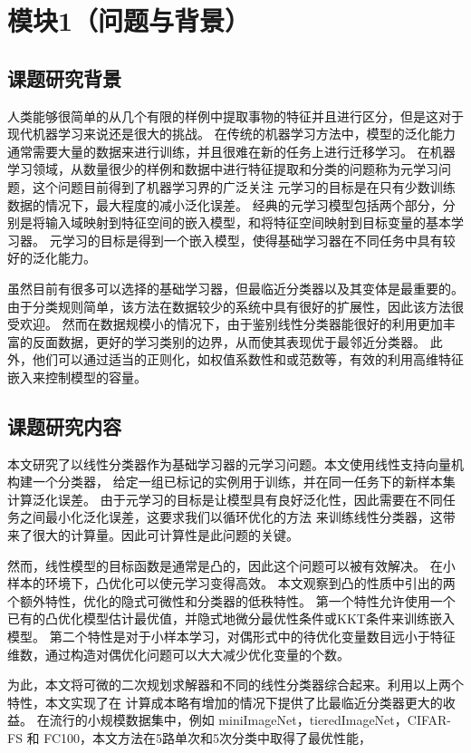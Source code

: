 

\chapter{模块1（问题与背景）}

\section{课题研究背景}

人类能够很简单的从几个有限的样例中提取事物的特征并且进行区分，但是这对于现代机器学习来说还是很大的挑战。
在传统的机器学习方法中，模型的泛化能力通常需要大量的数据来进行训练，并且很难在新的任务上进行迁移学习。
在机器学习领域，从数量很少的样例和数据中进行特征提取和分类的问题称为元学习问题，这个问题目前得到了机器学习界的广泛关注
元学习的目标是在只有少数训练数据的情况下，最大程度的减小泛化误差。
经典的元学习模型包括两个部分，分别是将输入域映射到特征空间的嵌入模型，和将特征空间映射到目标变量的基本学习器。
元学习的目标是得到一个嵌入模型，使得基础学习器在不同任务中具有较好的泛化能力。

虽然目前有很多可以选择的基础学习器，但最临近分类器以及其变体是最重要的。
由于分类规则简单，该方法在数据较少的系统中具有很好的扩展性，因此该方法很受欢迎。
然而在数据规模小的情况下，由于鉴别线性分类器能很好的利用更加丰富的反面数据，更好的学习类别的边界，从而使其表现优于最邻近分类器。
此外，他们可以通过适当的正则化，如权值系数性和或范数等，有效的利用高维特征嵌入来控制模型的容量。


\section{课题研究内容}

本文研究了以线性分类器作为基础学习器的元学习问题。本文使用线性支持向量机构建一个分类器，
给定一组已标记的实例用于训练，并在同一任务下的新样本集计算泛化误差。
由于元学习的目标是让模型具有良好泛化性，因此需要在不同任务之间最小化泛化误差，这要求我们以循环优化的方法
来训练线性分类器，这带来了很大的计算量。因此可计算性是此问题的关键。

然而，线性模型的目标函数是通常是凸的，因此这个问题可以被有效解决。
在小样本的环境下，凸优化可以使元学习变得高效。
本文观察到凸的性质中引出的两个额外特性，优化的隐式可微性和分类器的低秩特性。
第一个特性允许使用一个已有的凸优化模型估计最优值，并隐式地微分最优性条件或KKT条件来训练嵌入模型。
第二个特性是对于小样本学习，对偶形式中的待优化变量数目远小于特征维数，通过构造对偶优化问题可以大大减少优化变量的个数。


为此，本文将可微的二次规划求解器和不同的线性分类器综合起来。利用以上两个特性，本文实现了在
计算成本略有增加的情况下提供了比最临近分类器更大的收益。
在流行的小规模数据集中，例如 miniImageNet，tieredImageNet，CIFAR-FS 和 FC100，本文方法在5路单次和5次分类中取得了最优性能，


